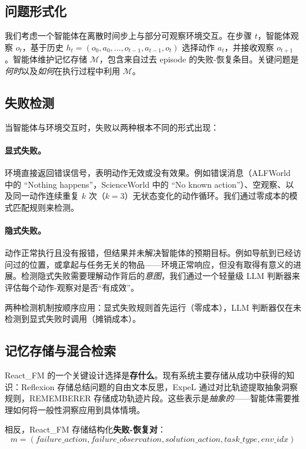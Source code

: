 \documentclass[11pt,a4paper]{article}
\newcommand{\method}{React\_FM}
\begin{document}
\subsection{问题形式化}

我们考虑一个智能体在离散时间步上与部分可观察环境交互。在步骤 $t$，智能体观察 $o_t$，基于历史 $h_t = (o_0, a_0, \ldots, o_{t-1}, a_{t-1}, o_t)$ 选择动作 $a_t$，并接收观察 $o_{t+1}$。智能体维护记忆存储 $\mathcal{M}$，包含来自过去 episode 的失败-恢复条目。关键问题是\emph{何时}以及\emph{如何}在执行过程中利用 $\mathcal{M}$。

\subsection{失败检测}

当智能体与环境交互时，失败以两种根本不同的形式出现：

\paragraph{显式失败。} 环境直接返回错误信号，表明动作无效或没有效果。例如错误消息（ALFWorld 中的 ``Nothing happens''，ScienceWorld 中的 ``No known action''）、空观察、以及同一动作连续重复 $k$ 次（$k{=}3$）无状态变化的动作循环。我们通过零成本的模式匹配规则来检测。

\paragraph{隐式失败。} 动作正常执行且没有报错，但结果并未解决智能体的预期目标。例如导航到已经访问过的位置，或拿起与任务无关的物品——环境正常响应，但没有取得有意义的进展。检测隐式失败需要理解动作背后的\emph{意图}，我们通过一个轻量级 LLM 判断器来评估每个动作-观察对是否``有成效''。

两种检测机制按顺序应用：显式失败规则首先运行（零成本），LLM 判断器仅在未检测到显式失败时调用（摊销成本）。

\subsection{记忆存储与混合检索}

\method{} 的一个关键设计选择是\textbf{存什么}。现有系统主要存储从成功中获得的知识：Reflexion 存储总结问题的自由文本反思，ExpeL 通过对比轨迹提取抽象洞察规则，REMEMBERER 存储成功轨迹片段。这些表示是\emph{抽象的}——智能体需要推理如何将一般性洞察应用到具体情境。

相反，\method{} 存储结构化\textbf{失败-恢复对}：
\begin{equation}
    m = (\textit{failure\_action}, \textit{failure\_observation}, \textit{solution\_action}, \textit{task\_type}, \textit{env\_idx})
\end{equation}
\end{document}
